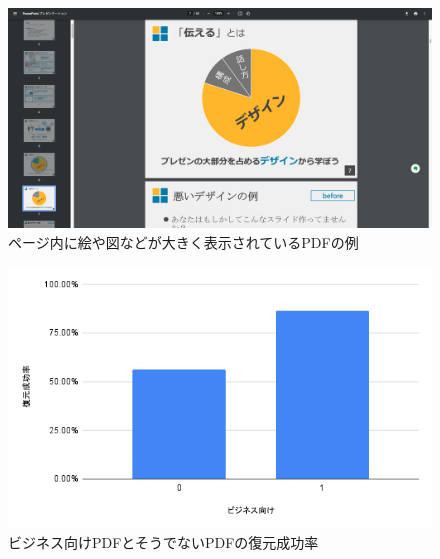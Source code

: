 \begin{figure}[htbp]
  \label{fig:example-figure-pdf}
  \begin{center}
    \includegraphics[bb=0 0 1918 998,width=15cm]{img/060_evaluation/consideration/pdf/example/example-pdf.pdf}
  \end{center}
  \caption{ページ内に絵や図などが大きく表示されているPDFの例}
\end{figure}

\begin{figure}[htbp]
  \label{fig:success-rate-business-or-not-pdf}
  \begin{center}
    \includegraphics[bb=0 0 600 371,width=15cm]{img/060_evaluation/consideration/pdf/success-rate-business-or-not-pdf.pdf}
  \end{center}
  \caption{ビジネス向けPDFとそうでないPDFの復元成功率}
\end{figure}

